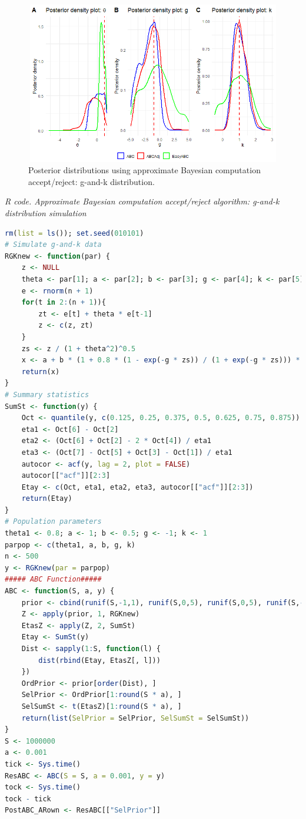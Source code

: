 \begin{enumerate}[leftmargin=*]
\begin{figure}[!h]
	\includegraphics[width=340pt, height=200pt]{Chapters/chapter15/figures/ABCown.png}
	\caption[List of figure caption goes here]{Posterior distributions using approximate Bayesian computation accept/reject: g-and-k distribution.}\label{figABCown}
\end{figure}

\begin{tcolorbox}[enhanced,width=4.67in,center upper,
	fontupper=\large\bfseries,drop shadow southwest,sharp corners]
	\textit{R code. Approximate Bayesian computation accept/reject algorithm: g-and-k distribution simulation}
	\begin{VF}
		\begin{lstlisting}[language=R]
rm(list = ls()); set.seed(010101)
# Simulate g-and-k data
RGKnew <- function(par) {
	z <- NULL
	theta <- par[1]; a <- par[2]; b <- par[3]; g <- par[4]; k <- par[5]
	e <- rnorm(n + 1)
	for(t in 2:(n + 1)){
		zt <- e[t] + theta * e[t-1]
		z <- c(z, zt)
	}
	zs <- z / (1 + theta^2)^0.5
	x <- a + b * (1 + 0.8 * (1 - exp(-g * zs)) / (1 + exp(-g * zs))) * (1 + zs^2)^k * zs
	return(x)
}
# Summary statistics
SumSt <- function(y) {
	Oct <- quantile(y, c(0.125, 0.25, 0.375, 0.5, 0.625, 0.75, 0.875))
	eta1 <- Oct[6] - Oct[2]
	eta2 <- (Oct[6] + Oct[2] - 2 * Oct[4]) / eta1
	eta3 <- (Oct[7] - Oct[5] + Oct[3] - Oct[1]) / eta1
	autocor <- acf(y, lag = 2, plot = FALSE)
	autocor[["acf"]][2:3]
	Etay <- c(Oct, eta1, eta2, eta3, autocor[["acf"]][2:3])
	return(Etay)
}
# Population parameters
theta1 <- 0.8; a <- 1; b <- 0.5; g <- -1; k <- 1
parpop <- c(theta1, a, b, g, k)
n <- 500
y <- RGKnew(par = parpop) 
##### ABC Function#####
ABC <- function(S, a, y) {
	prior <- cbind(runif(S,-1,1), runif(S,0,5), runif(S,0,5), runif(S,-5,5), runif(S,-0.5,5))
	Z <- apply(prior, 1, RGKnew)
	EtasZ <- apply(Z, 2, SumSt)
	Etay <- SumSt(y) 
	Dist <- sapply(1:S, function(l) {
		dist(rbind(Etay, EtasZ[, l]))
	})
	OrdPrior <- prior[order(Dist), ]
	SelPrior <- OrdPrior[1:round(S * a), ]
	SelSumSt <- t(EtasZ)[1:round(S * a), ]
	return(list(SelPrior = SelPrior, SelSumSt = SelSumSt))
}
S <- 1000000
a <- 0.001
tick <- Sys.time()
ResABC <- ABC(S = S, a = 0.001, y = y)
tock <- Sys.time()
tock - tick
PostABC_ARown <- ResABC[["SelPrior"]]
\end{lstlisting}
	\end{VF}
\end{tcolorbox}


\end{enumerate}
